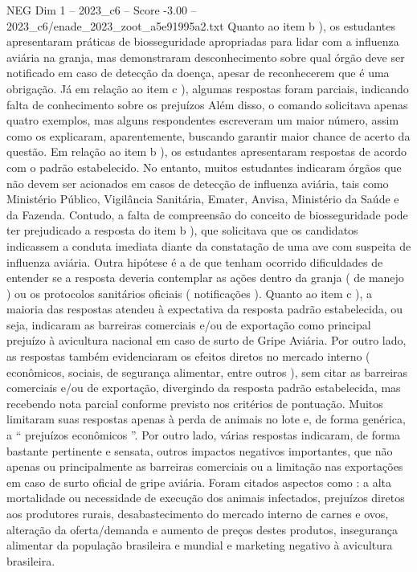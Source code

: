 \begin{textsample}{NEG Dim 1 – 2023\_c6 – Score -3.00 – 2023\_c6/enade\_2023\_zoot\_a5e91995a2.txt}
Quanto ao item b ), os estudantes apresentaram práticas de biosseguridade apropriadas para lidar com a influenza aviária na granja, mas demonstraram desconhecimento sobre qual órgão deve ser notificado em caso de detecção da doença, apesar de reconhecerem que é uma obrigação.
Já em relação ao item c ), algumas respostas foram parciais, indicando falta de conhecimento sobre os prejuízos Além disso, o comando solicitava apenas quatro exemplos, mas alguns respondentes escreveram um maior número, assim como os explicaram, aparentemente, buscando garantir maior chance de acerto da questão.
Em relação ao item b ), os estudantes apresentaram respostas de acordo com o padrão estabelecido.
No entanto, muitos estudantes indicaram órgãos que não devem ser acionados em casos de detecção de influenza aviária, tais como Ministério Público, Vigilância Sanitária, Emater, Anvisa, Ministério da Saúde e da Fazenda.
Contudo, a falta de compreensão do conceito de biosseguridade pode ter prejudicado a resposta do item b ), que solicitava que os candidatos indicassem a conduta imediata diante da constatação de uma ave com suspeita de influenza aviária.
Outra hipótese é a de que tenham ocorrido dificuldades de entender se a resposta deveria contemplar as ações dentro da granja ( de manejo ) ou os protocolos sanitários oficiais ( notificações ).
Quanto ao item c ), a maioria das respostas atendeu à expectativa da resposta padrão estabelecida, ou seja, indicaram as barreiras comerciais e/ou de exportação como principal prejuízo à avicultura nacional em caso de surto de Gripe Aviária.
Por outro lado, as respostas também evidenciaram os efeitos diretos no mercado interno ( econômicos, sociais, de segurança alimentar, entre outros ), sem citar as barreiras comerciais e/ou de exportação, divergindo da resposta padrão estabelecida, mas recebendo nota parcial conforme previsto nos critérios de pontuação.
Muitos limitaram suas respostas apenas à perda de animais no lote e, de forma genérica, a “ prejuízos econômicos ”.
Por outro lado, várias respostas indicaram, de forma bastante pertinente e sensata, outros impactos negativos importantes, que não apenas ou principalmente as barreiras comerciais ou a limitação nas exportações em caso de surto oficial de gripe aviária.
Foram citados aspectos como : a alta mortalidade ou necessidade de execução dos animais infectados, prejuízos diretos aos produtores rurais, desabastecimento do mercado interno de carnes e ovos, alteração da oferta/demanda e aumento de preços destes produtos, insegurança alimentar da população brasileira e mundial e marketing negativo à avicultura brasileira.

\end{textsample}
